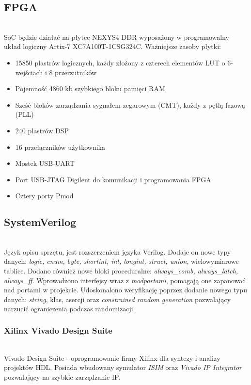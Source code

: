 \documentclass[11pt,a4paper]{article}
\begin{document}
	\subsection{FPGA}
	\hspace{5mm}
		\\SoC będzie działać na płytce NEXYS4 DDR wyposażony w programowalny układ logiczny Artix-7 XC7A100T-1CSG324C. Ważniejsze zasoby płytki:\cite{nexys}
		\begin{itemize}
			\item 15850 plastrów logicznych, każdy złożony z czterech elementów LUT o 6-wejściach i 8 przerzutników
			\item Pojemność 4860 kb szybkiego bloku pamięci RAM
			\item Sześć bloków zarządzania sygnałem zegarowym (CMT), każdy z pętlą fazową (PLL)
			\item 240 plastrów DSP
			\item 16 przełączników użytkownika
			\item Mostek USB-UART
			\item Port USB-JTAG Digilent do komunikacji i programowania FPGA
			\item Cztery porty Pmod
		\end{itemize}

	\subsection{SystemVerilog}
	\hspace{5mm}
		\\Język opisu sprzętu, jest rozszerzeniem języka Verilog. Dodaje on nowe typy danych: \textit{logic, enum, byte, shortint, int, longint, struct, union}, wielowymiarowe tablice. Dodano również nowe bloki proceduralne: \textit{always\_comb, always\_latch, always\_ff}. Wprowadzono interfejsy wraz z \textit{modportami}, pomagają one zapanować nad portami w projekcie. Udoskonalono weryfikację poprzez dodanie nowego typu danych: \textit{string}, klas, asercji oraz \textit{constrained random generation} pozwalający narzucić ograniczenia podczas randomizacji.\cite{SV}
			
			\subsubsection{Xilinx Vivado Design Suite}
			\hspace{5mm}
				\\Vivado Design Suite - oprogramowanie firmy Xilinx dla syntezy i analizy projektów HDL. Posiada wbudowany symulator \textit{ISIM} oraz \textit{Vivado IP Integrator} pozwalający na szybkie zarządzanie IP.
				
\end{document}
